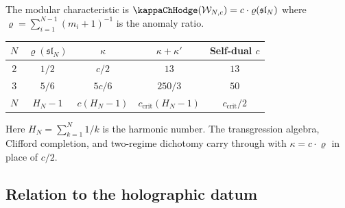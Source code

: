 \begin{remark}
The modular characteristic is $\kappaChHodge(\mathcal{W}_{N,c}) = c \cdot
\varrho(\mathfrak{sl}_N)$ where $\varrho = \sum_{i=1}^{N-1}(m_i+1)^{-1}$
is the anomaly ratio.
\begin{center}
\renewcommand{\arraystretch}{1.3}
\begin{tabular}{ccccc}
\toprule
$N$ & $\varrho(\mathfrak{sl}_N)$ & $\kappa$ &
$\kappa + \kappa'$ & Self-dual $c$ \\
\midrule
$2$ & $1/2$ & $c/2$ & $13$ & $13$ \\
$3$ & $5/6$ & $5c/6$ & $250/3$ & $50$ \\
$N$ & $H_N - 1$ & $c(H_N - 1)$ &
$c_{\mathrm{crit}}(H_N-1)$ & $c_{\mathrm{crit}}/2$ \\
\bottomrule
\end{tabular}
\end{center}
Here $H_N = \sum_{k=1}^N 1/k$ is the harmonic number. The
transgression algebra, Clifford completion, and two-regime dichotomy
carry through with $\kappa = c \cdot \varrho$ in place of $c/2$.
\end{remark}

%
%

\subsection{Relation to the holographic datum}

